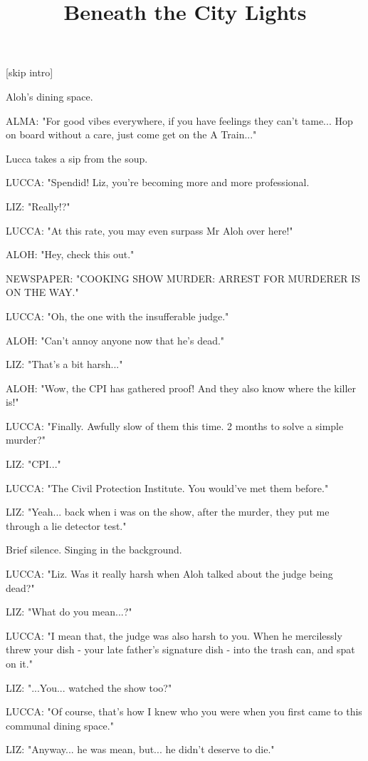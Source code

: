 \documentclass[11pt]{article}
\begin{document}
\ttfamily
\title{Beneath the City Lights}
\maketitle

[skip intro]

Aloh's dining space.

ALMA: "For good vibes everywhere, if you have feelings they can't tame...
Hop on board without a care, just come get on the A Train..."

Lucca takes a sip from the soup. 

LUCCA: "Spendid! Liz, you're becoming more and more professional.

LIZ: "Really!?"

LUCCA: "At this rate, you may even surpass Mr Aloh over here!"

ALOH: "Hey, check this out."

NEWSPAPER: "COOKING SHOW MURDER: ARREST FOR MURDERER IS ON THE WAY."

LUCCA: "Oh, the one with the insufferable judge."

ALOH: "Can't annoy anyone now that he's dead."

LIZ: "That's a bit harsh..."

ALOH: "Wow, the CPI has gathered proof! And they also know where the killer is!"

LUCCA: "Finally. 
Awfully slow of them this time.
2 months to solve a simple murder?"

LIZ: "CPI..."

LUCCA: "The Civil Protection Institute. 
You would've met them before."

LIZ: "Yeah... back when i was on the show, after the murder, they put me through a lie detector test."

Brief silence.
Singing in the background.

LUCCA: "Liz. 
Was it really harsh when Aloh talked about the judge being dead?"

LIZ: "What do you mean...?"

LUCCA: "I mean that, the judge was also harsh to you.
When he mercilessly threw your dish - your late father's signature dish - into the trash can, and spat on it."

LIZ: "...You... watched the show too?"

LUCCA: "Of course, that's how I knew who you were when you first came to this communal dining space."

LIZ: "Anyway... he was mean, but... he didn't deserve to die."
\end{document}
